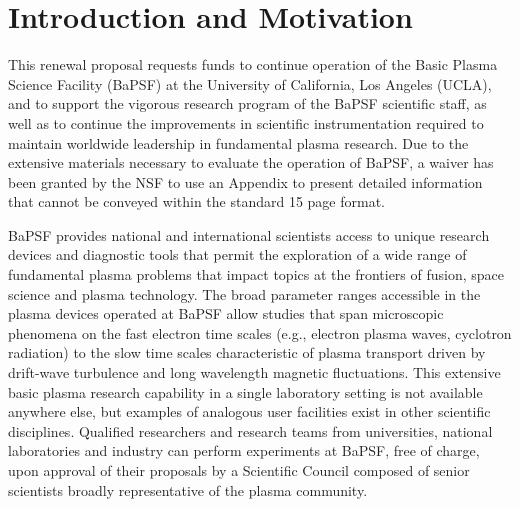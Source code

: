 \documentclass[11pt]{article}
\date{}
\title{}
\begin{document}
\section{Introduction and Motivation}

This renewal proposal requests funds to continue operation of the Basic
Plasma Science Facility (BaPSF) at the University of California, Los
Angeles (UCLA), and to support the vigorous research program of the
BaPSF scientific staff, as well as to continue the improvements in
scientific instrumentation required to maintain worldwide leadership in
fundamental plasma research. Due to the extensive materials necessary to
evaluate the operation of BaPSF, a waiver has been granted by the NSF to
use an Appendix to present detailed information that cannot be conveyed
within the standard 15 page format.

BaPSF provides national and international scientists access to unique
research devices and diagnostic tools that permit the exploration of a
wide range of fundamental plasma problems that impact topics at the
frontiers of fusion, space science and plasma technology. The broad
parameter ranges accessible in the plasma devices operated at BaPSF
allow studies that span microscopic phenomena on the fast electron time
scales (e.g., electron plasma waves, cyclotron radiation) to the slow
time scales characteristic of plasma transport driven by drift-wave
turbulence and long wavelength magnetic fluctuations. This extensive
basic plasma research capability in a single laboratory setting is not
available anywhere else, but examples of analogous user facilities exist
in other scientific disciplines. Qualified researchers and research
teams from universities, national laboratories and industry can perform
experiments at BaPSF, free of charge, upon approval of their proposals
by a Scientific Council composed of senior scientists broadly
representative of the plasma community.
\end{document}
